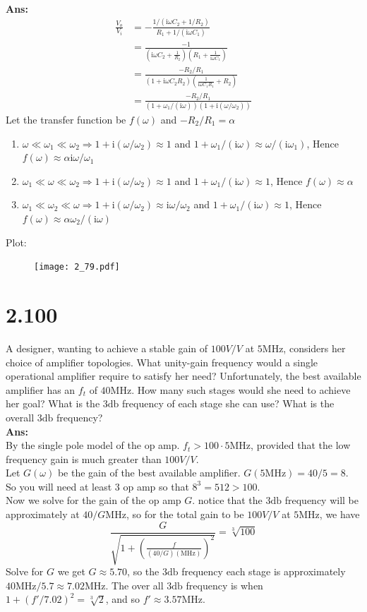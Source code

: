 \documentclass[12pt, a4paper]{article}
\newcommand{\sdb}{\si{\decibel}}
\newcommand{\img}{\mathrm{i}}
\newcommand{\Ans}{{\\ \bf Ans:} \\}
\begin{document}
\Ans
\begin{align*}
  \frac{V_o}{V_i} &= -\frac{1 / (\img \omega C_2 + 1 / R_2)}{R_1 + 1 / (\img \omega C_1)}\\
  &= \frac{-1}{\left( \img \omega C_2 + \frac{1}{R_2} \right) \left( R_1 + \frac{1}{\img \omega C_1} \right)}\\
  &= \frac{-R_2/R_1}{(1 + \img \omega C_2 R_2) \left( \frac{1}{\img \omega C_1 R_1} + R_2 \right)}\\
  &= \frac{-R_2/R_1}{(1+\omega_1/(\img \omega))(1+\img(\omega/\omega_2))}
\end{align*}
Let the transfer function be $f(\omega)$ and $- R_2 / R_1 = \alpha$
\begin{enumerate}[label=(\alph*)]
  \item $\omega \ll \omega_1 \ll \omega_2 \Rightarrow 1 + \img(\omega / \omega_2) \approx 1$ and $1 + \omega_1/(\img \omega) \approx \omega / (\img \omega_1)$, Hence $f(\omega) \approx \alpha \img \omega / \omega_1$
  \item $\omega_1 \ll \omega \ll \omega_2 \Rightarrow 1 + \img(\omega / \omega_2) \approx 1$ and $1 + \omega_1/(\img \omega) \approx 1$, Hence $f(\omega) \approx \alpha$
  \item $\omega_1 \ll \omega_2 \ll \omega \Rightarrow 1 + \img(\omega / \omega_2) \approx \img \omega / \omega_2$ and $1 + \omega_1/(\img \omega) \approx 1$, Hence $f(\omega) \approx \alpha \omega_2 / (\img \omega)$
\end{enumerate}
Plot: 
\begin{figure}[H]
  \centering
  \texttt{[image: 2\_79.pdf]}
\end{figure}

\section{2.100}
A designer, wanting to achieve a stable gain of $100 \si{V/V}$ at $5 \si{\mega\hertz}$, considers her choice of amplifier topologies. What unity-gain frequency would a single operational amplifier require to satisfy her need? Unfortunately, the best available amplifier has an $f_t$ of $40 \si{\mega\hertz}$. How many such stages would she need to achieve her goal? What is the $3\sdb$ frequency of each stage she can use? What is the overall $3\sdb$ frequency?
\Ans
By the single pole model of the op amp. $f_t > 100 \cdot 5 \si{\mega\hertz}$, provided that the low frequency gain is much greater than $100 \si{V/V}$.\\ 
Let $G(\omega)$ be the gain of the best available amplifier. $G(5\si{\mega\hertz}) = 40 / 5 = 8$. So you will need at least $3$ op amp so that $8^3 = 512 > 100$.\\
Now we solve for the gain of the op amp $G$. notice that the $3\sdb$ frequency will be approximately at $40/G \si{\mega\hertz}$, so for the total gain to be $100 \si{V/V}$ at $5 \si{\mega\hertz}$, we have
\[
  \frac{G}{\displaystyle \sqrt{1 + \left(\frac{f}{(40 / G) (\si{\mega\hertz})}\right)^2}} = \sqrt[3]{100}
\]
Solve for $G$ we get $G \approx 5.70$, so the $3 \sdb$ frequency each stage is approximately $40\si{\mega\hertz} / 5.7 \approx 7.02\si{\mega\hertz}$. The over all $3 \sdb$ frequency is when $1 + (f'/7.02)^2 = \sqrt[3]{2}$, and so $f' \approx 3.57 \si{\mega\hertz}$.
\end{document}

